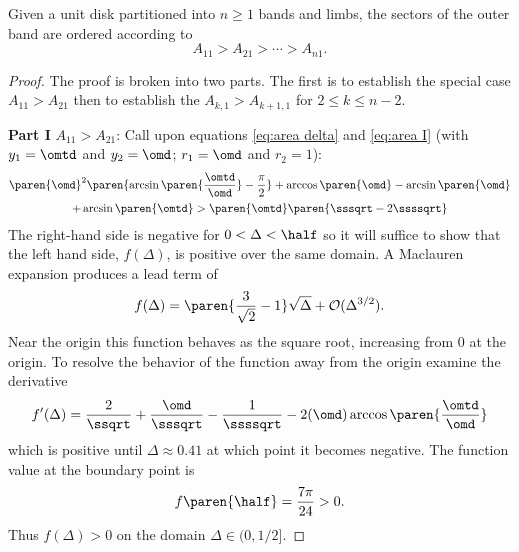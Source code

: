 \begin{myLemma}  
Given a unit disk partitioned into $n\ge1$ bands and limbs, the sectors of the outer band are ordered according to
  \begin{equation}
    A_{11} > A_{21} > \cdots > A_{n1}.
  \end{equation}
\end{myLemma}  %
\begin{proof}  %
The proof is broken into two parts. The first is to establish the special case $A_{11}>A_{21}$ then to establish the $A_{k,1}>A_{k+1,1}$ for $2\le k \le n-2$.

\textbf{Part I} $A_{11} > A_{21}$:
Call upon equations \eqref{eq:area delta} and \eqref{eq:area I} (with $y_{1} = \omtd$ and $y_{2} = \omd$; $r_{1} = \omd$ and $r_{2} = 1$):
  \begin{multline}
    \paren{\omd}^{2} \paren{\arcsin\paren{\frac{\omtd}{\omd}} -  \frac{\pi}{2}} + \arccos\paren{\omd} - \arcsin \paren{\omd} \\ +\arcsin \paren{\omtd} >
    \paren{\omtd} \paren{\sssqrt - 2 \ssssqrt}
  \end{multline}
The right-hand side is negative for $0<\Delta<\half$ so it will suffice to show that the left hand side, $f(\Delta)$, is positive over the same domain. A Maclauren expansion produces a lead term of 
  \begin{equation}
    f(\Delta) = \paren{\frac{3}{\sqrt{2}} - 1} \sqrt{\Delta} + \mathcal{O}(\Delta^{3/2}) .
  \end{equation}
Near the origin this function behaves as the square root, increasing from 0 at the origin. To resolve the behavior of the function away from the origin examine the derivative
  \begin{equation}
    f'(\Delta) = \frac{2}{\ssqrt} + \frac{\omd}{\sssqrt} - \frac{1}{\ssssqrt} - 2 (\omd ) \arccos \paren{\frac{\omtd}{\omd}}
  \end{equation}
which is positive until $\Delta \approx 0.41$ at which point it becomes negative. The function value at the boundary point is
  \begin{equation}
    f \paren{\half} =\frac{7\pi}{24} > 0.
  \end{equation}
Thus $f(\Delta)> 0$ on the domain $\Delta \in (0,1/2]$.


\end{proof}
